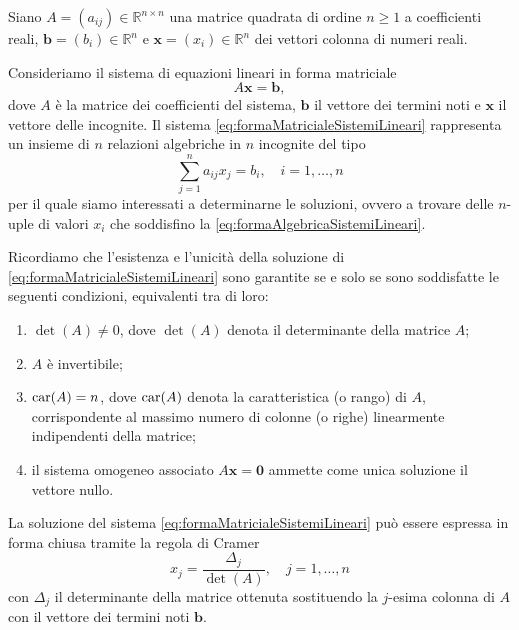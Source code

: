 Siano $A=(a_{ij})\in\mathbb{R}^{n\times n}$ una matrice quadrata di ordine $n\ge1$ a coefficienti reali, $\mathbf{b}=(b_{i})\in\mathbb{R}^{n}$
e $\mathbf{x}=(x_{i})\in\mathbb{R}^{n}$ dei vettori colonna di numeri reali.

Consideriamo il sistema di equazioni lineari in forma matriciale
\begin{equation}
    \label{eq:formaMatricialeSistemiLineari}
    A\mathbf{x}=\mathbf{b},
\end{equation}
dove $A$ \`e la matrice dei coefficienti del sistema, $\mathbf{b}$ il vettore dei termini noti e $\mathbf{x}$ il vettore delle incognite.\newline
Il sistema \eqref{eq:formaMatricialeSistemiLineari} rappresenta un insieme di $n$ relazioni algebriche in
$n$ incognite del tipo
\begin{equation}
    \label{eq:formaAlgebricaSistemiLineari}
    \sum_{j=1}^{n}a_{ij}x_{j}=b_{i},\quad i = 1,\dots,n
\end{equation}
per il quale siamo interessati a determinarne le soluzioni, ovvero a trovare delle $n$-uple di valori $x_{i}$ che
soddisfino la \eqref{eq:formaAlgebricaSistemiLineari}.

Ricordiamo che l'esistenza e l'unicit\`a della soluzione di \eqref{eq:formaMatricialeSistemiLineari} sono garantite se e solo se sono soddisfatte
le seguenti condizioni, equivalenti tra di loro:
\begin{enumerate}
    \item $\det(A)\ne 0$, dove $\det(A)$ denota il determinante della matrice $A$;
    \item $A$ \`e invertibile;
    \item $\operatorname{car}(A)= n$, dove $\operatorname{car}(A)$ denota la caratteristica (o rango) di $A$, corrispondente al massimo numero di colonne (o righe) linearmente indipendenti della matrice;
    \item il sistema omogeneo associato $A\mathbf{x}=\mathbf{0}$ ammette come unica soluzione il vettore nullo.
\end{enumerate}

La soluzione del sistema \eqref{eq:formaMatricialeSistemiLineari} pu\`o essere espressa in forma chiusa tramite la regola di Cramer
\begin{equation}
    x_{j} = \frac{\Delta_{j}}{\det(A)},\quad j = 1,\dots,n
\end{equation}
con $\Delta_{j}$ il determinante della matrice ottenuta sostituendo la $j$-esima colonna di $A$ con il vettore dei termini noti $\mathbf{b}$.

